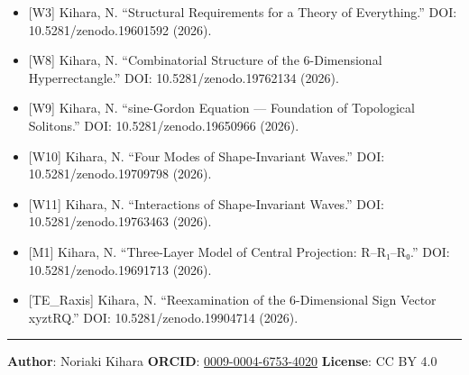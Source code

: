 \documentclass[a4paper,11pt]{article}
\providecommand{\tightlist}{\setlength{\itemsep}{0pt}\setlength{\parskip}{0pt}}
\begin{document}
\begin{itemize}
\tightlist
\item
  {[}W3{]} Kihara, N. ``Structural Requirements for a Theory of
  Everything.'' DOI: 10.5281/zenodo.19601592 (2026).
\item
  {[}W8{]} Kihara, N. ``Combinatorial Structure of the 6-Dimensional
  Hyperrectangle.'' DOI: 10.5281/zenodo.19762134 (2026).
\item
  {[}W9{]} Kihara, N. ``sine-Gordon Equation --- Foundation of
  Topological Solitons.'' DOI: 10.5281/zenodo.19650966 (2026).
\item
  {[}W10{]} Kihara, N. ``Four Modes of Shape-Invariant Waves.'' DOI:
  10.5281/zenodo.19709798 (2026).
\item
  {[}W11{]} Kihara, N. ``Interactions of Shape-Invariant Waves.'' DOI:
  10.5281/zenodo.19763463 (2026).
\item
  {[}M1{]} Kihara, N. ``Three-Layer Model of Central Projection:
  R--R₁--R₀.'' DOI: 10.5281/zenodo.19691713 (2026).
\item
  {[}TE\_Raxis{]} Kihara, N. ``Reexamination of the 6-Dimensional Sign
  Vector xyztRQ.'' DOI: 10.5281/zenodo.19904714 (2026).
\end{itemize}

\begin{center}\rule{0.5\linewidth}{0.5pt}\end{center}

\textbf{Author}: Noriaki Kihara \textbf{ORCID}:
\href{https://orcid.org/0009-0004-6753-4020}{0009-0004-6753-4020}
\textbf{License}: CC BY 4.0
\end{document}
